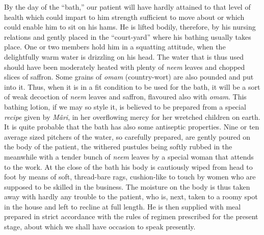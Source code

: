 \documentclass[a4paper, 12pt, oneside, english, twocolumn]{article}
\begin{document}
By the day of the ``bath,'' our patient will have hardly attained to that level of health which could impart to him strength sufficient to move about or which could enable him to sit on his hams. He is lifted bodily, therefore, by his nursing relations and gently placed in the ``court-yard'' where his bathing usually takes place. One or two members hold him in a squatting attitude, when the delightfully warm water is drizzling on his head. The water that is thus used should have been moderately heated with plenty of \emph{neem} leaves and chopped slices of saffron. Some grains of \emph{omam} (country-wort) are also pounded and put into it. Thus, when it is in a fit condition to be used for the bath, it will be a sort of weak decoction of \emph{neem} leaves and saffron, flavoured also with \emph{omam}. This bathing lotion, if we may so style it, is believed to be prepared from a special \emph{recipe} given by \emph{Mâri}, in her overflowing mercy for her wretched children on earth. It is quite probable that the bath has also some antiseptic properties. Nine or ten average sized pitchers of the water, so carefully prepared, are gently poured on the body of the patient, the withered pustules being softly rubbed in the meanwhile with a tender bunch of \emph{neem} leaves by a special woman that attends to the work. At the close of the bath his body is cautiously wiped from head to foot by means of soft, thread-bare rags, cushion-like to touch by women who are supposed to be skilled in the business. The moisture on the body is thus taken away with hardly any trouble to the patient, who is, next, taken to a roomy spot in the house and left to recline at full length. He is then supplied with meal prepared in strict accordance with the rules of regimen prescribed for the present stage, about which we shall have occasion to speak presently.
\end{document}
